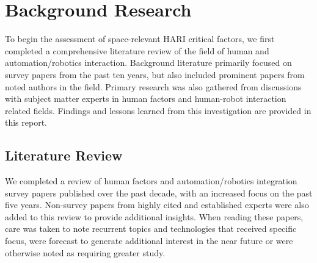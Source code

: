 
\section{Background Research}
To begin the assessment of space-relevant HARI critical factors, we first completed a comprehensive literature review of the field of human and automation/robotics interaction.
Background literature primarily focused on survey papers from the past ten years, but also included prominent papers from noted authors in the field.
Primary research was also gathered from discussions with subject matter experts in human factors and human-robot interaction related fields.
Findings and lessons learned from this investigation are provided in this report.

\subsection{Literature Review}
We completed a review of human factors and automation/robotics integration survey papers published over the past decade, with an increased focus on the past five years.
Non-survey papers from highly cited and established experts were also added to this review to provide additional insights.
When reading these papers, care was taken to note recurrent topics and technologies that received specific focus, were forecast to generate additional interest in the near future or were otherwise noted as requiring greater study.

